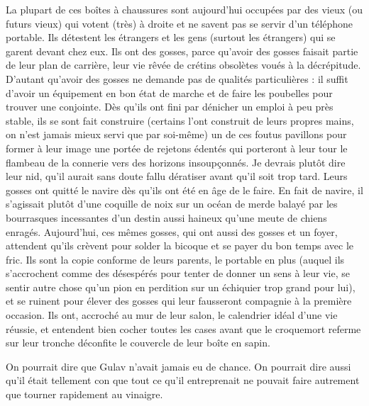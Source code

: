 La plupart de ces boîtes à chaussures sont aujourd’hui occupées par des vieux (ou futurs vieux) qui votent (très) à droite et ne savent pas se servir d’un téléphone portable. Ils détestent les étrangers et les gens (surtout les étrangers) qui se garent devant chez eux. Ils ont des gosses, parce qu’avoir des gosses faisait partie de leur plan de carrière, leur vie rêvée de crétins obsolètes voués à la décrépitude. D’autant qu’avoir des gosses ne demande pas de qualités particulières : il suffit d’avoir un équipement en bon état de marche et de faire les poubelles pour trouver une conjointe. Dès qu’ils ont fini par dénicher un emploi à peu près stable, ils se sont fait construire (certains l’ont construit de leurs propres mains, on n’est jamais mieux servi que par soi-même) un de ces foutus pavillons pour former à leur image une portée de rejetons édentés qui porteront à leur tour le flambeau de la connerie vers des horizons insoupçonnés. Je devrais plutôt dire leur nid, qu’il aurait sans doute fallu dératiser avant qu’il soit trop tard. Leurs gosses ont quitté le navire dès qu’ils ont été en âge de le faire. En fait de navire, il s’agissait plutôt d’une coquille de noix sur un océan de merde balayé par les bourrasques incessantes d’un destin aussi haineux qu’une meute de chiens enragés. Aujourd’hui, ces mêmes gosses, qui ont aussi des gosses et un foyer, attendent qu’ils crèvent pour solder la bicoque et se payer du bon temps avec le fric. Ils sont la copie conforme de leurs parents, le portable en plus (auquel ils s’accrochent comme des désespérés pour tenter de donner un sens à leur vie, se sentir autre chose qu’un pion en perdition sur un échiquier trop grand pour lui), et se ruinent pour élever des gosses qui leur fausseront compagnie à la première occasion. Ils ont, accroché au mur de leur salon, le calendrier idéal d’une vie réussie, et entendent bien cocher toutes les cases avant que le croquemort referme sur leur tronche déconfite le couvercle de leur boîte en sapin.

On pourrait dire que Gulav n’avait jamais eu de chance. On pourrait dire aussi qu’il était tellement con que tout ce qu’il entreprenait ne pouvait faire autrement que tourner rapidement au vinaigre.

